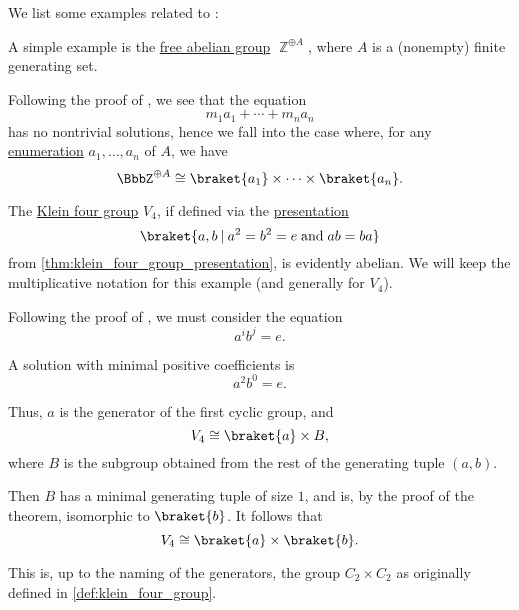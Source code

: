 \begin{example}\label{ex:thm:fundamental_theorem_of_finitely_generated_abelian_groups}
  We list some examples related to :
  \begin{thmenum}
     A simple example is the \hyperref[def:free_abelian_group]{free abelian group} \( \BbbZ^{\oplus A} \), where \( A \) is a (nonempty) finite generating set.

    Following the proof of , we see that the equation
    \begin{equation*}
      m_1 a_1 + \cdots + m_n a_n
    \end{equation*}
    has no nontrivial solutions, hence we fall into the case where, for any \hyperref[def:enumeration]{enumeration} \( a_1, \ldots, a_n \) of \( A \), we have
    \begin{equation*}
      \BbbZ^{\oplus A} \cong \braket{ a_1 } \times \cdots \times \braket{ a_n }.
    \end{equation*}

     The \hyperref[def:klein_four_group]{Klein four group} \( V_4 \), if defined via the \hyperref[def:group_presentation]{presentation}
    \begin{equation*}
      \braket{ a, b \given a^2 = b^2 = e \T{and} ab = ba }
    \end{equation*}
    from \cref{thm:klein_four_group_presentation}, is evidently abelian. We will keep the multiplicative notation for this example (and generally for \( V_4 \)).

    Following the proof of , we must consider the equation
    \begin{equation*}
      a^i b^j = e.
    \end{equation*}

    A solution with minimal positive coefficients is
    \begin{equation*}
      a^2 b^0 = e.
    \end{equation*}

    Thus, \( a \) is the generator of the first cyclic group, and
    \begin{equation*}
      V_4 \cong \braket{ a } \times B,
    \end{equation*}
    where \( B \) is the subgroup obtained from the rest of the generating tuple \( (a, b) \).

    Then \( B \) has a minimal generating tuple of size \( 1 \), and is, by the proof of the theorem, isomorphic to \( \braket{ b } \). It follows that
    \begin{equation*}
      V_4 \cong \braket{ a } \times \braket{ b }.
    \end{equation*}

    This is, up to the naming of the generators, the group \( C_2 \times C_2 \) as originally defined in \cref{def:klein_four_group}.
  \end{thmenum}
\end{example}
